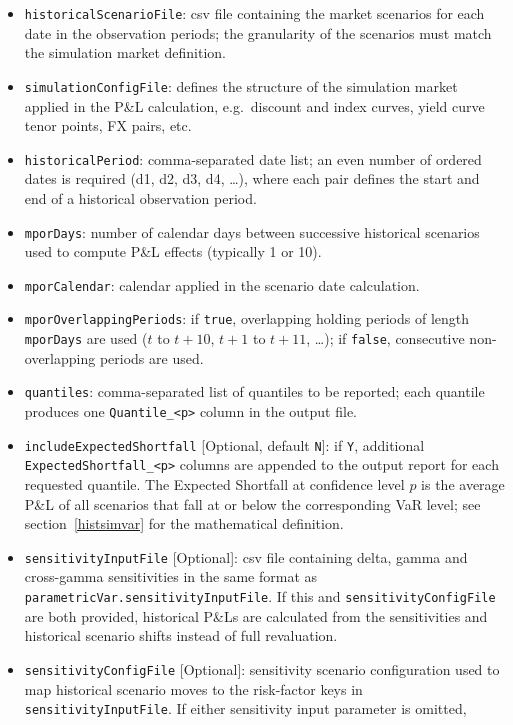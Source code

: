 \begin{itemize}
\item {\tt historicalScenarioFile}: csv file containing the market scenarios for each date in the observation
  periods; the granularity of the scenarios must match the simulation market definition.
\item {\tt simulationConfigFile}: defines the structure of the simulation market applied in the P\&L calculation,
  e.g.\ discount and index curves, yield curve tenor points, FX pairs, etc.
\item {\tt historicalPeriod}: comma-separated date list; an even number of ordered dates is required
  (d1, d2, d3, d4, \ldots), where each pair defines the start and end of a historical observation period.
\item {\tt mporDays}: number of calendar days between successive historical scenarios used to compute P\&L effects
  (typically 1 or 10).
\item {\tt mporCalendar}: calendar applied in the scenario date calculation.
\item {\tt mporOverlappingPeriods}: if {\tt true}, overlapping holding periods of length \texttt{mporDays} are used
  ($t$ to $t{+}10$, $t{+}1$ to $t{+}11$, \ldots); if {\tt false}, consecutive non-overlapping periods are used.
\item {\tt quantiles}: comma-separated list of quantiles to be reported; each quantile produces one
  {\tt Quantile\_<p>} column in the output file.
\item {\tt includeExpectedShortfall} [Optional, default {\tt N}]: if {\tt Y}, additional
  {\tt ExpectedShortfall\_<p>} columns are appended to the output report for each requested quantile. The
  Expected Shortfall at confidence level $p$ is the average P\&L of all scenarios that fall at or below
  the corresponding VaR level; see section~\ref{histsimvar} for the mathematical definition.
\item {\tt sensitivityInputFile} [Optional]: csv file containing delta, gamma and cross-gamma sensitivities in
  the same format as {\tt parametricVar.sensitivityInputFile}. If this and {\tt sensitivityConfigFile} are both
  provided, historical P\&Ls are calculated from the sensitivities and historical scenario shifts instead of full
  revaluation.
\item {\tt sensitivityConfigFile} [Optional]: sensitivity scenario configuration used to map historical scenario
  moves to the risk-factor keys in {\tt sensitivityInputFile}. If either sensitivity input parameter is omitted,

\end{itemize}
